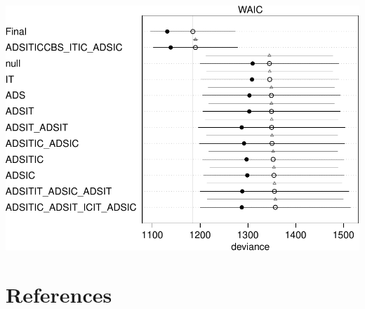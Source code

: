 \documentclass[10pt,dvipsnames,enabledeprecatedfontcommands]{scrartcl}
\begin{document}
\begin{center}\includegraphics[width=1\linewidth]{bayesianReport_files/figure-latex/unnamed-chunk-11-1} \end{center}

\normalsize

\section*{References}\label{references}

\vspace{-3mm}
\end{document}

